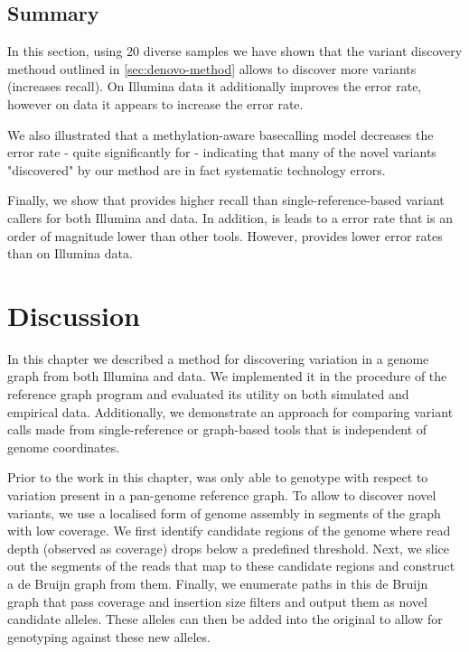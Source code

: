 \subsection{Summary}

In this section, using 20 diverse \ecoli{} samples we have shown that the \denovo{} variant discovery methoud outlined in \autoref{sec:denovo-method} allows \pandora{} to discover more variants (increases recall). On Illumina data it additionally improves the error rate, however on \ont{} data it appears to increase the error rate.

We also illustrated that a methylation-aware \ont{} basecalling model decreases the \pandora{} error rate - quite significantly for \denovo{} - indicating that many of the novel variants "discovered" by our method are in fact systematic technology errors.

Finally, we show that \pandora{} provides higher recall than single-reference-based variant callers for both Illumina and \ont{} data. In addition, is leads to a \ont{} error rate that is an order of magnitude lower than other tools. However,  provides lower error rates than \pandora{} on Illumina data.

\section{Discussion}
\label{sec:denovo-discussion}

In this chapter we described a method for discovering \denovo{} variation in a genome graph from both Illumina and \ont{} data. We implemented it in the  procedure of the reference graph program \pandora{} and evaluated its utility on both simulated and empirical data. Additionally, we demonstrate an approach for comparing variant calls made from single-reference or graph-based tools that is independent of genome coordinates.

Prior to the work in this chapter, \pandora{} was only able to genotype with respect to variation present in a pan-genome reference graph. To allow \pandora{} to discover novel variants, we use a localised form of genome assembly in segments of the graph with low \kmer{} coverage. We first identify candidate regions of the genome where read depth (observed as \kmer{} coverage) drops below a predefined threshold. Next, we slice out the segments of the reads that map to these candidate regions and construct a de Bruijn graph from them. Finally, we enumerate paths in this de Bruijn graph that pass coverage and insertion size filters and output them as novel candidate alleles. These alleles can then be added into the original \panrg{} to allow for genotyping against these new alleles.

